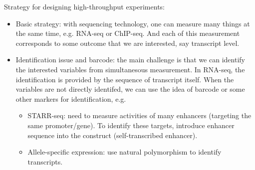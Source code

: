 \documentclass{report}
\begin{document}
Strategy for designing high-throughput experiments: 
\begin{itemize}
	\item Basic strategy: with sequencing technology, one can measure many things at the same time, e.g. RNA-seq or ChIP-seq. And each of this measurement corresponds to some outcome that we are interested, say transcript level. 
	
	\item Identification issue and barcode: the main challenge is that we can identify the interested variables from simultanesous measurement. In RNA-seq, the identification is provided by the sequence of transcript itself. When the variables are not directly identifed, we can use the idea of barcode or some other markers for identification, e.g.
	\begin{itemize}
		\item STARR-seq: need to measure activities of many enhancers (targeting the same promoter/gene). To identify these targets, introduce enhancer sequence into the construct (self-transcribed enhancer). 
		\item Allele-specific expression: use natural polymorphism to identify transcripts. 
	\end{itemize}
\end{itemize}
\end{document}
